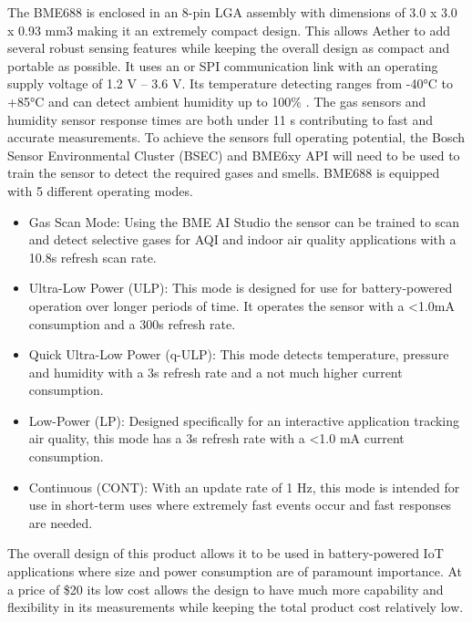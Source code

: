 The BME688 is enclosed in an 8-pin LGA assembly with dimensions of 3.0 x 3.0 x 0.93 mm3 making it an extremely compact design. This allows Aether to add several robust sensing features while keeping the overall design as compact and portable as possible. It uses an \iic or SPI communication link with an operating supply voltage of 1.2 V – 3.6 V. Its temperature detecting ranges from -40°C to +85°C and can detect ambient humidity up to 100\% . The gas sensors and humidity sensor response times are both under 11 s contributing to fast and accurate measurements. To achieve the sensors full operating potential, the Bosch Sensor Environmental Cluster (BSEC) and BME6xy API will need to be used to train the sensor to detect the required gases and smells. BME688 is equipped with 5 different operating modes.

\begin {itemize}
\item Gas Scan Mode: Using the BME AI Studio the sensor can be trained to scan and detect selective gases for AQI and indoor air quality applications with a 10.8s refresh scan rate.
\item Ultra-Low Power (ULP):  This mode is designed for use for battery-powered operation over longer periods of time. It operates the sensor with a <1.0mA consumption and a 300s refresh rate.
\item Quick Ultra-Low Power (q-ULP): This mode detects temperature, pressure and humidity with a 3s refresh rate and a not much higher current consumption.
\item Low-Power (LP): Designed specifically for an interactive application tracking air quality, this mode has a 3s refresh rate with a <1.0 mA current consumption. 
\item Continuous (CONT): With an update rate of 1 Hz, this mode is intended for use in short-term uses where extremely fast events occur and fast responses are needed. 

\end {itemize}
The overall design of this product allows it to be used in battery-powered IoT applications where size and power consumption are of paramount importance. At a price of \$20 its low cost allows the design to have much more capability and flexibility in its measurements while keeping the total product cost relatively low.